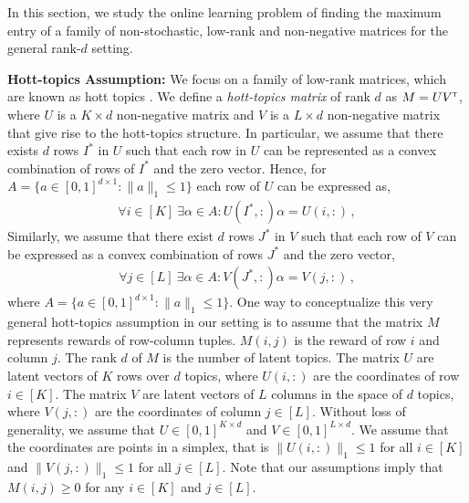 
In this section, we study the online learning problem of finding the maximum entry of a family of non-stochastic, low-rank and non-negative matrices for the general rank-$d$ setting.  

\textbf{Hott-topics Assumption:} We focus on a family of low-rank matrices, which are known as hott topics \citep{recht2012factoring}. We define a \emph{hott-topics matrix} of rank $d$ as $M = U V^\mathsf{\scriptscriptstyle T}$, where $U$ is a $K \times d$ non-negative matrix and $V$ is a $L \times d$ non-negative matrix that give rise to the hott-topics structure. In particular, we assume that there exists $d$ rows $I^\ast$ in $U$ such that each row in $U$ can be represented as a convex combination of rows of $I^\ast$ and the zero vector. Hence, for $A = \{a \in [0, 1]^{d \times 1}: \|a\|_1 \leq 1\}$ each row of $U$ can be expressed as,
\begin{align}
  \forall i \in [K] \ \exists \alpha \in A: U(I^\ast, :) \alpha = U(i, :)\,,
  \label{eq:hott topics1}
\end{align}
Similarly, we assume that there exist $d$ rows $J^\ast$ in $V$ such that each row of $V$ can be expressed as a convex combination of rows $J^\ast$ and the zero vector,
\begin{align}
  \forall j \in [L] \ \exists \alpha \in A: V(J^\ast, :) \alpha = V(j, :)\,,
  \label{eq:hott topics}
\end{align}
where $A = \{a \in [0, 1]^{d \times 1}: \|a\|_1 \leq 1\}$. One way to conceptualize this very general hott-topics assumption in our setting  is to assume that the matrix $M$ represents rewards of row-column tuples. $M(i, j)$ is the reward of row $i$ and column $j$. The rank $d$ of $M$ is the number of latent topics. The matrix $U$ are latent vectors of $K$ rows over $d$ topics, where $U(i, :)$ are the coordinates of row $i \in [K]$. The matrix $V$ are latent vectors of $L$ columns in the space of $d$ topics, where $V(j, :)$ are the coordinates of column $j \in [L]$. Without loss of generality, we assume that $U \in [0, 1]^{K \times d}$ and $V \in [0, 1]^{L \times d}$. We assume that the coordinates are points in a simplex, that is $\|U(i, :)\|_1 \leq 1$ for all $i \in [K]$ and $\|V(j, :)\|_1 \leq 1$ for all $j \in [L]$. Note that our assumptions imply that $M(i, j) \geq 0$ for any $i \in [K]$ and $j \in [L]$.


